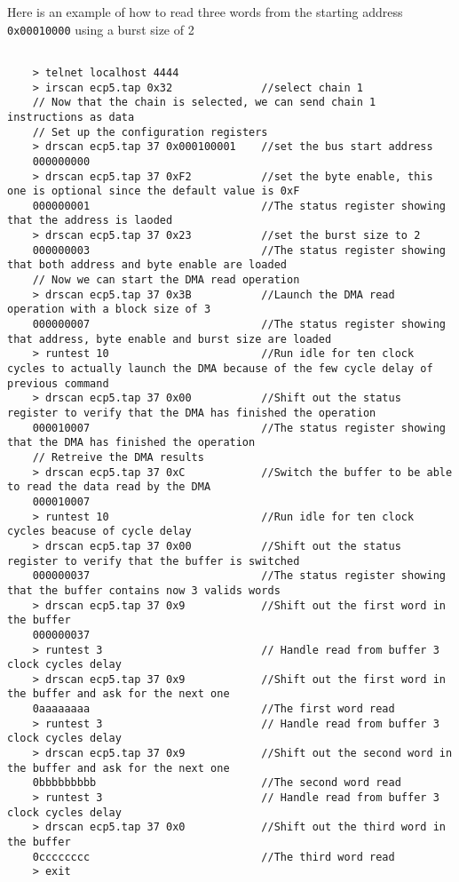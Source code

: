 \documentclass[a4paper,11pt,oneside]{report}
\begin{document}
Here is an example of how to read three words from the starting address \texttt{0x00010000} using a burst size of 2
\begin{lstlisting}

    > telnet localhost 4444
    > irscan ecp5.tap 0x32              //select chain 1
    // Now that the chain is selected, we can send chain 1 instructions as data
    // Set up the configuration registers
    > drscan ecp5.tap 37 0x000100001    //set the bus start address
    000000000
    > drscan ecp5.tap 37 0xF2           //set the byte enable, this one is optional since the default value is 0xF
    000000001                           //The status register showing that the address is laoded
    > drscan ecp5.tap 37 0x23           //set the burst size to 2
    000000003                           //The status register showing that both address and byte enable are loaded 
    // Now we can start the DMA read operation
    > drscan ecp5.tap 37 0x3B           //Launch the DMA read operation with a block size of 3
    000000007                           //The status register showing that address, byte enable and burst size are loaded             
    > runtest 10                        //Run idle for ten clock cycles to actually launch the DMA because of the few cycle delay of previous command
    > drscan ecp5.tap 37 0x00           //Shift out the status register to verify that the DMA has finished the operation
    000010007                           //The status register showing that the DMA has finished the operation
    // Retreive the DMA results
    > drscan ecp5.tap 37 0xC            //Switch the buffer to be able to read the data read by the DMA
    000010007
    > runtest 10                        //Run idle for ten clock cycles beacuse of cycle delay
    > drscan ecp5.tap 37 0x00           //Shift out the status register to verify that the buffer is switched
    000000037                           //The status register showing that the buffer contains now 3 valids words
    > drscan ecp5.tap 37 0x9            //Shift out the first word in the buffer
    000000037
    > runtest 3                         // Handle read from buffer 3 clock cycles delay
    > drscan ecp5.tap 37 0x9            //Shift out the first word in the buffer and ask for the next one
    0aaaaaaaa                           //The first word read
    > runtest 3                         // Handle read from buffer 3 clock cycles delay
    > drscan ecp5.tap 37 0x9            //Shift out the second word in the buffer and ask for the next one
    0bbbbbbbbb                          //The second word read
    > runtest 3                         // Handle read from buffer 3 clock cycles delay
    > drscan ecp5.tap 37 0x0            //Shift out the third word in the buffer
    0cccccccc                           //The third word read
    > exit

\end{lstlisting}
\end{document}

